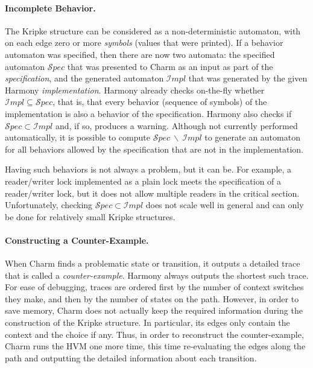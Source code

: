\documentclass[twocolumn]{article}
\begin{document}
\paragraph{Incomplete Behavior.}

The Kripke structure can be considered as a non-deterministic
automaton, with on each edge zero or more \emph{symbols} (values
that were printed).  If a behavior automaton was specified,
then there are now two automata: the specified automaton
${\mathcal Spec}$ that was presented to Charm as an input as
part of the \emph{specification}, and the generated automaton
${\mathcal Impl}$ that was generated by the given Harmony
\emph{implementation}.  Harmony already checks on-the-fly whether
${\mathcal Impl} \subseteq {\mathcal Spec}$, that is, that every
behavior (sequence of symbols) of the implementation is also a
behavior of the specification.  Harmony also checks if
${\mathcal Spec} \subset {\mathcal Impl}$ and, if so,
produces a warning.
Although not currently performed automatically, it is possible to compute
${\mathcal Spec}~\backslash~{\mathcal Impl}$
to generate an automaton for all behaviors allowed by the
specification that are not in the implementation.

Having such behaviors is not always a problem, but it can be.  For
example, a reader/writer lock implemented as a plain lock meets the
specification of a reader/writer lock, but it does not allow multiple
readers in the critical section.  Unfortunately, checking ${\mathcal
Spec} \subset {\mathcal Impl}$ does not scale well in general and can
only be done for relatively small Kripke structures.

\paragraph{Constructing a Counter-Example.}

When Charm finds a problematic state or transition, it outputs
a detailed trace that is called a \emph{counter-example}.
Harmony always outputs the shortest such trace.
For ease of debugging, traces are ordered first by the number of
context switches they make, and then by the number of states on
the path.
However, in order to save memory, Charm does not actually keep
the required information during the construction of the Kripke
structure.  In particular, its edges only contain the context
and the choice if any.  Thus, in order to reconstruct the
counter-example, Charm runs the HVM one more time, this time
re-evaluating the edges along the path and outputting the
detailed information about each transition.
\end{document}
